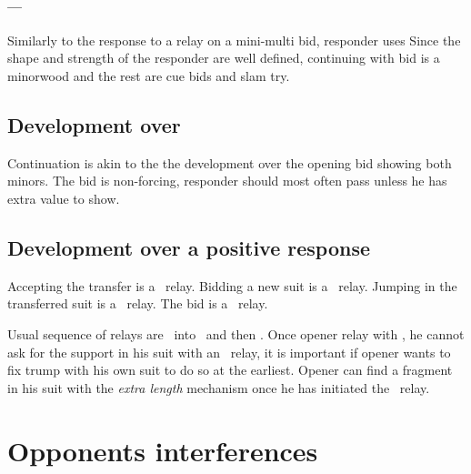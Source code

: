 \paragraph{\bid{1\CS}–\bid{2\HS}–\bid{2\SpS}}
Similarly to the response to a relay on a mini-multi bid, responder uses
Since the shape and strength of the responder are well defined, continuing with  bid is a minorwood and the rest are cue bids and slam try.
\subsection{Development over }
Continuation is akin to the the development over the \bid{2\NT} opening bid showing both minors. The \bid{2\NT} bid is non-forcing, responder should most often pass unless he has extra value to show.
\subsection{Development over a positive response}
Accepting the transfer is a \lambdaRelay\ relay. Bidding a new suit is a \alphaRelay\ relay. Jumping in the transferred suit is a \gammaRelay\ relay. The \bid{2\NT} bid is a \betaRelay\ relay.

Usual sequence of relays are \lambdaRelay\ into \gammaRelay\ and then \betaRelay. Once opener relay with \lambdaRelay, he cannot ask for the support in his suit with an \alphaRelay\ relay, it is important if opener wants to fix trump with his own suit to do so at the earliest. Opener can find a fragment in his suit with the \emph{extra length} mechanism once he has initiated the \lambdaRelay\ relay.
\section{Opponents interferences}

